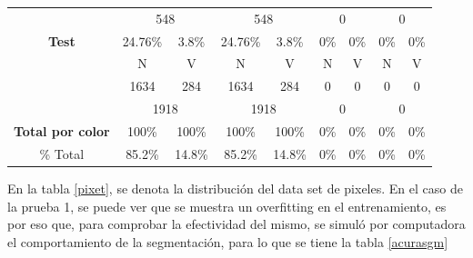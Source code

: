 \documentclass[twoside,spanish,ESP,MSc]{plantillaLabUPV}
\theoremstyle{definition}
\begin{document}
\begin{table}[h]
\begin{tabular}{|c|c|c|c|c|c|c|c|c|}
		\cline{2-9} 
		& \multicolumn{2}{c|}{548}                           & \multicolumn{2}{c|}{548}                           & \multicolumn{2}{c|}{0}                           & \multicolumn{2}{c|}{0}                           \\ \cline{2-9} 
		\multirow{-4}{*}{\textbf{Test}}            & 24.76\%                  & 3.8\%                   & 24.76\%                  & 3.8\%                   & 0\%                      & 0\%                      & 0\%                      & 0\%                      \\ \hline
		& {\color[HTML]{F56B00} N} & {\color[HTML]{009901} V} & {\color[HTML]{F56B00} N} & {\color[HTML]{009901} V} & {\color[HTML]{F56B00} N} & {\color[HTML]{009901} V} & {\color[HTML]{F56B00} N} & {\color[HTML]{009901} V} \\ \cline{2-9} 
		& 1634                     & 284                      & 1634                     & 284                      & 0                        & 0                        & 0                        & 0                        \\
		\cline{2-9} 
		& \multicolumn{2}{c|}{1918}                           & \multicolumn{2}{c|}{1918}                           & \multicolumn{2}{c|}{0}                           & \multicolumn{2}{c|}{0}                           \\ \cline{2-9} 
		\multirow{-3}{*}{\textbf{Total por color}} & 100\%                    & 100\%                    & 100\%                    & 100\%                    & 0\%                      & 0\%                      & 0\%                      & 0\%                      \\ \hline
		\% Total                                   & 85.2\%                   & 14.8\%                   & 85.2\%                   & 14.8\%                   & 0\%                      & 0\%                      & 0\%                      & 0\%                      \\ \hline
	\end{tabular}
\end{table}


En la tabla \ref{pixet}, se denota la distribución del data set de pixeles. En el caso de la prueba 1, se puede ver que se muestra un overfitting en el entrenamiento, es por eso que, para comprobar la efectividad del mismo, se simuló por computadora el comportamiento de la segmentación, para lo que se tiene la tabla \ref{acurasgm}
\end{document}
